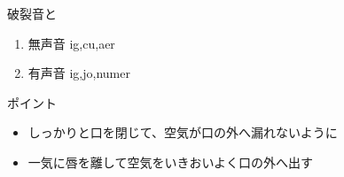 \documentclass[aspectratio=169,xcolor={dvipsnames,table}]{beamer}
\begin{document}
\begin{frame}[plain]{破裂音と}

\large

\begin{enumerate}
 \item 無声音 \hspace{20pt}ig,\hspace{1\zw}cu,\hspace{1\zw}aer
 \item  有声音 \hspace{20pt}ig,\hspace{1\zw}jo,\hspace{1\zw}numer
\end{enumerate}

\vspace*{20pt}

\normalsize
ポイント

\begin{itemize}
 \item しっかりと口を閉じて、空気が口の外へ漏れないように
 \item 一気に唇を離して空気をいきおいよく口の外へ出す
\end{itemize}

\hfill{}

\end{frame}
\end{document}
